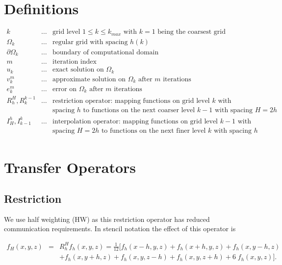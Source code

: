\documentclass[11pt, oneside, a4paper]{article}
\begin{document}
\section{Definitions}

\begin{eqnarray*}
k&\dots&\mbox{grid level $1\le k \le k_{max}$ with $k=1$ being the coarsest grid}\\
\Omega_k &\dots& \mbox{regular grid with spacing $h(k)$}\\
\partial \Omega_k &\dots& \mbox{boundary of computational domain}\\
m&\dots& \mbox{iteration index}\\
u_k&\dots& \mbox{exact solution on $\Omega_k$}\\ 
v_k^m&\dots& \mbox{approximate solution on $\Omega_k$ after $m$ iterations}\\
e_k^m&\dots& \mbox{error on $\Omega_k$ after $m$ iterations}\\ 
R_h^H, R_k^{k-1}&\dots& \mbox{restriction operator: mapping functions on grid level $k$ with} \\
&& \mbox{spacing $h$ to functions on the next coarser level $k-1$ with spacing $H=2h$}\\ 
I_H^h, I_{k-1}^k&\dots& \mbox{interpolation operator: mapping functions on grid level $k-1$ with }\\
&&\mbox{spacing $H=2h$ to functions on the next finer level $k$ with spacing $h$}\\ 
\end{eqnarray*}


\section{Transfer Operators}

\subsection{Restriction}

We use half weighting (HW) as this restriction operator has reduced communication requirements. In stencil notation the effect of this operator is

\begin{eqnarray*}
f_H(x,y,z) &=& R_h^H f_h(x,y,z) = \frac{1}{12}[ f_h(x-h,y,z)+f_h(x+h,y,z)+f_h(x,y-h,z)\\
&& +f_h(x,y+h,z)+f_h(x,y,z-h)+f_h(x,y,z+h)+6\;f_h(x,y,z)].
\end{eqnarray*}
\end{document}
